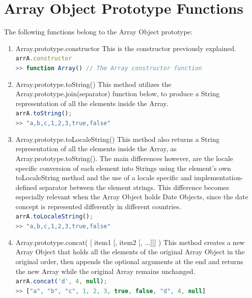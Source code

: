 \documentclass[a4paper,11pt,twoside]{report}
\def\jsinline{\lstinline[language=JavaScript, basicstyle=\small]}
\begin{document}
\section{Array Object Prototype Functions}
The following functions belong to the Array Object prototype: 
\begin{enumerate}
\item Array.prototype.constructor \newline
This is the constructor previously explained.\\
\jsinline|arrA.constructor| \\
\jsinline|>> function Array() // The Array constructor function|

\item Array.prototype.toString() \newline
This method utilizes the Array.prototype.join(separator) function below, to produce a String representation of all the elements inside the Array.\\
\jsinline|arrA.toString();|\\
\jsinline|>> "a,b,c,1,2,3,true,false"|

\item Array.prototype.toLocaleString() \newline
This method also returns a String representation of all the elements inside the Array, as Array.prototype.toString(). The main differences however, are the locale specific conversion of each element into Strings using the element's own toLocaleString method and the use of a locale specific and implementation-defined separator between the element strings. This difference becomes especially relevant when the Array Object holds Date Objects, since the date concept is represented differently in different countries.\\
\jsinline|arrA.toLocaleString();|\\
\jsinline|>> "a,b,c,1,2,3,true,false"|

\item Array.prototype.concat( [ item1 [, item2 [, ...]]] ) \newline
This method creates a new Array Object that holds all the elements of the original Array Object in the original order, then appends the optional arguments at the end and returns the new Array while the original Array remains unchanged.\\
\jsinline|arrA.concat('d', 4, null);|\\
\jsinline|>> ["a", "b", "c", 1, 2, 3, true, false, "d", 4, null]|


\end{enumerate}
\end{document}
